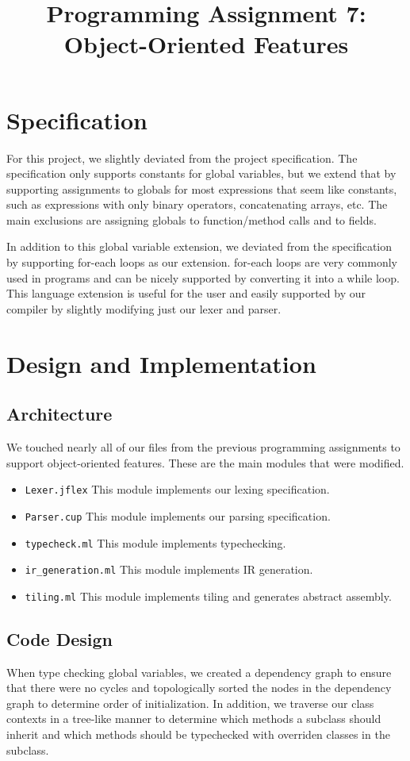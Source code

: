 \documentclass{hw} \title{Programming Assignment 7:\\ Object-Oriented Features}
\begin{document}
\section{Specification}\label{sec:specification} For this project, we slightly deviated from the project specification. The specification only supports constants for global variables, but we extend that by supporting assignments to globals for most expressions that seem like constants, such as expressions with only binary operators, concatenating arrays, etc. The main exclusions are assigning globals to function/method calls and to fields.

In addition to this global variable extension, we deviated from the specification by supporting for-each loops as our extension. for-each loops are very commonly used in programs and can be nicely supported by converting it into a while loop. This language extension is useful for the user and easily supported by our compiler by slightly modifying just our lexer and parser.

\section{Design and Implementation}\label{sec:design} \subsection{Architecture}
We touched nearly all of our files from the previous programming assignments to support object-oriented features. These are the main modules that were modified.  \begin{itemize}
  \item \texttt{Lexer.jflex} This module implements our lexing specification.

  \item \texttt{Parser.cup} This module implements our parsing specification.

  \item \texttt{typecheck.ml} This module implements typechecking.

  \item \texttt{ir\_generation.ml} This module implements IR generation.
  
  \item \texttt{tiling.ml} This module implements tiling and generates abstract assembly.

\end{itemize}

\subsection{Code Design}
When type checking global variables, we created a dependency graph to ensure that there were no cycles and topologically sorted the nodes in the dependency graph to determine order of initialization. In addition, we traverse our class contexts in a tree-like manner to determine which methods a subclass should inherit and which methods should be typechecked with overriden classes in the subclass.
\end{document}
